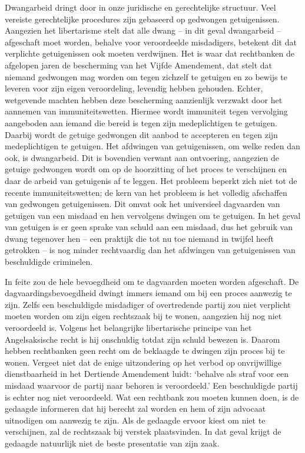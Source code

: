 \documentclass[
  a5paper,
  smalldemyvopaper,10pt,twoside,onecolumn,openright,extrafontsizes,hidelinks]{memoir}
\begin{document}
Dwangarbeid dringt door in onze juridische en gerechtelijke structuur.
Veel vereiste gerechtelijke procedures zijn gebaseerd op gedwongen
getuigenissen. Aangezien het libertarisme stelt dat alle dwang -- in dit
geval dwangarbeid -- afgeschaft moet worden, behalve voor veroordeelde
misdadigers, betekent dit dat verplichte getuigenissen ook moeten
verdwijnen. Het is waar dat rechtbanken de afgelopen jaren de
bescherming van het Vijfde Amendement, dat stelt dat niemand gedwongen
mag worden om tegen zichzelf te getuigen en zo bewijs te leveren voor
zijn eigen veroordeling, levendig hebben gehouden. Echter, wetgevende
machten hebben deze bescherming aanzienlijk verzwakt door het aannemen
van immuniteitswetten. Hiermee wordt immuniteit tegen vervolging
aangeboden aan iemand die bereid is tegen zijn medeplichtigen te
getuigen. Daarbij wordt de getuige gedwongen dit aanbod te accepteren en
tegen zijn medeplichtigen te getuigen. Het afdwingen van getuigenissen,
om welke reden dan ook, is dwangarbeid. Dit is bovendien verwant aan
ontvoering, aangezien de getuige gedwongen wordt om op de hoorzitting of
het proces te verschijnen en daar de arbeid van getuigenis af te leggen.
Het probleem beperkt zich niet tot de recente immuniteitswetten; de kern
van het probleem is het volledig afschaffen van gedwongen getuigenissen.
Dit omvat ook het universieel dagvaarden van getuigen van een misdaad en
hen vervolgens dwingen om te getuigen. In het geval van getuigen is er
geen sprake van schuld aan een misdaad, dus het gebruik van dwang
tegenover hen -- een praktijk die tot nu toe niemand in twijfel heeft
getrokken -- is nog minder rechtvaardig dan het afdwingen van
getuigenissen van beschuldigde criminelen.

In feite zou de hele bevoegdheid om te dagvaarden moeten worden
afgeschaft. De dagvaardingsbevoegdheid dwingt immers iemand om bij een
proces aanwezig te zijn. Zelfs een beschuldigde misdadiger of
overtredende partij zou niet verplicht moeten worden om zijn eigen
rechtszaak bij te wonen, aangezien hij nog niet veroordeeld is. Volgens
het belangrijke libertarische principe van het Angelsaksische recht is
hij onschuldig totdat zijn schuld bewezen is. Daarom hebben rechtbanken
geen recht om de beklaagde te dwingen zijn proces bij te wonen. Vergeet
niet dat de enige uitzondering op het verbod op onvrijwillige
dienstbaarheid in het Dertiende Amendement luidt: `behalve als straf
voor een misdaad waarvoor de partij naar behoren is veroordeeld.' Een
beschuldigde partij is echter nog niet veroordeeld. Wat een rechtbank
zou moeten kunnen doen, is de gedaagde informeren dat hij berecht zal
worden en hem of zijn advocaat uitnodigen om aanwezig te zijn. Als de
gedaagde ervoor kiest om niet te verschijnen, zal de rechtszaak bij
verstek plaatsvinden. In dat geval krijgt de gedaagde natuurlijk niet de
beste presentatie van zijn zaak.
\end{document}
